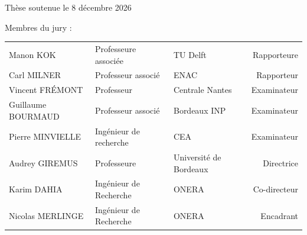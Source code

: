 \vspace{1.1cm}

{\large Thèse soutenue le 8 décembre 2026}

\vspace{0.55cm}

\hspace{1cm}Membres du jury :
\begin{center}
	\begin{tabular}{lllr}
		Manon KOK&Professeure associée&TU Delft&Rapporteure\\
		Carl MILNER&Professeur associé&ENAC&Rapporteur\\
		Vincent FRÉMONT&Professeur&Centrale Nantes&Examinateur\\
		Guillaume BOURMAUD&Professeur associé&Bordeaux INP&Examinateur\\
		Pierre MINVIELLE&Ingénieur de recherche&CEA&Examinateur\\
		Audrey GIREMUS&Professeure&Université de Bordeaux&Directrice\\
		Karim DAHIA&Ingénieur de Recherche&ONERA&Co-directeur\\
		Nicolas MERLINGE&Ingénieur de Recherche&ONERA&Encadrant\\
	\end{tabular}
\end{center}

\restoregeometry
\cleardoublepage
\pagestyle{plain}
\frontmatter %

